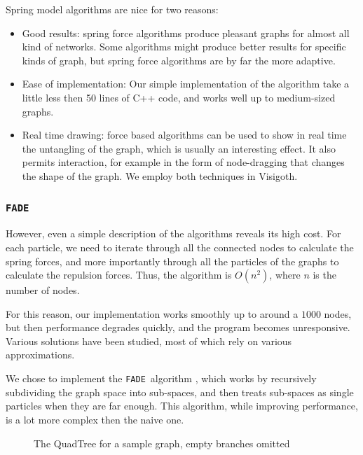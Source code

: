 \documentclass[a4paper,11pt,titlepage]{article}
\newcommand{\FADE}{\texttt{FADE}\ }
\begin{document}
Spring model algorithms are nice for two reasons:

\begin{itemize}
\item Good results: spring force algorithms produce pleasant graphs
  for almost all kind of networks. Some algorithms might produce
  better results for specific kinds of graph, but spring force
  algorithms are by far the more adaptive.

\item Ease of implementation: Our simple implementation of the
  algorithm take a little less then 50 lines of C++ code, and works
  well up to medium-sized graphs.

\item Real time drawing: force based algorithms can be used to show in
  real time the untangling of the graph, which is usually an
  interesting effect. It also permits interaction, for example in the
  form of node-dragging that changes the shape of the graph. We employ
  both techniques in Visigoth.
\end{itemize}

\subsubsection{\FADE}

However, even a simple description of the algorithms reveals its high
cost. For each particle, we need to iterate through all the connected
nodes to calculate the spring forces, and more importantly through all
the particles of the graphs to calculate the repulsion forces. Thus,
the algorithm is \(O(n^2)\), where \(n\) is the number of nodes.

For this reason, our implementation works smoothly up to around a
\(1000\) nodes, but then performance degrades quickly, and the program
becomes unresponsive. Various solutions have been studied, most of
which rely on various approximations.

We chose to implement the \FADE algorithm \cite{fade}, which works by
recursively subdividing the graph space into sub-spaces, and then
treats sub-spaces as single particles when they are far enough. This
algorithm, while improving performance, is a lot more complex then the
naive one.

\begin{figure}
  \centering
  \hspace{10pt}
  \caption{The QuadTree for a sample graph, empty branches omitted}
  \label{fig:quadtree}
\end{figure}
\end{document}
